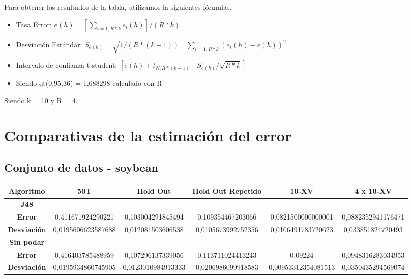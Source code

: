 \documentclass{article}
\begin{document}
Para obtener los resultados de la tabla, utilizamos la siguientes fórmulas.

\begin{itemize}
	\item Tasa Error: \hspace{0.5cm}	 $e(h) = [\sum_{i = 1,R*k}e_i(h)] / (R*k)$
	\item Desviación Estándar: \hspace{0.5cm} $S_{e(h)} = \sqrt{1/(R*(k-1)) \quad \sum_{i = 1,R*k}{(e_i(h) - e(h))^2}} $
	\item Intervalo de confianza t-student: 	\hspace{0.5cm}	$[e(h) \pm t_{N,R*(k-1)} \quad S_{e(h)} / \sqrt{R*k}]$
	\item Siendo \hspace{0.5cm}	qt(0.95,36) = 1,688298 \hspace{0.5cm}	calculado con R
\end{itemize}
Siendo k = 10 y R = 4.


\newpage

\section{Comparativas de la estimación del error}

\subsection{Conjunto de datos - soybean}
\begin{table}[h]
	\begin{adjustbox}{center}
		\begin{tabular}{|c|c|c|c|c|c|}
			\hline
			\rowcolor[gray]{0.8}
			\textbf{Algoritmo} & \textbf{50T} & \textbf{Hold
			 Out} & \textbf{Hold Out Repetido} & \textbf{10-XV} & \textbf{4 x 10-XV}\\ \hline
			 
			 \rowcolor[gray]{0.8}
			 \textbf{J48} & \multicolumn{5}{|c|}{ } \\ \hline
			 
			 \textbf{Error} & 0,411671924290221 & 0,103004291845494 & 0,109354467203066 & 0,0821500000000001 & 0,0882352941176471 \\ \hline
			 
			 \textbf{Desviación} & 0,0195606623587688 & 0,012081503606538 & 0,0105673992752356 & 0,0106491783720623 & 0,033851824720493 \\ \hline
			 
			 \rowcolor[gray]{0.8}
			 \textbf{Sin podar} & \multicolumn{5}{|c|}{ } \\ \hline
			 
			 \textbf{Error} & 0,416403785488959 & 0,107296137339056 & 0,113711024413243 & 0,09224 & 0,0948316283034953 \\ \hline
			 
			 \textbf{Desviación} & 0,0195934860745905 & 0,0123010984913333 & 0,0206986099918583 & 0,00953312354081513 & 0,0350435294569074 \\ \hline
		\end{tabular}
	\end{adjustbox}
\end{table}
\end{document}
